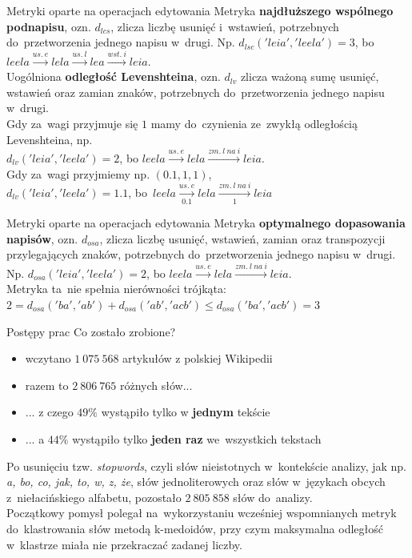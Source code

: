 \documentclass[11pt,pdftex,mathserif]{beamer}\usepackage[]{graphicx}\usepackage[]{color}
\theoremstyle{definition}
\begin{document}
\begin{frame}{Metryki oparte na operacjach edytowania}
Metryka \textbf{najdłuższego wspólnego podnapisu}, ozn. $d_{lcs}$, zlicza liczbę usunięć i~wstawień, potrzebnych do~przetworzenia jednego napisu w~drugi. Np. $d_{lsc}('leia', 'leela') = 3$, bo~$leela  \xrightarrow{us.\ e} lela  \xrightarrow{us.\ l} lea  \xrightarrow{wst.\ i} leia$.\\
\pause
Uogólniona \textbf{odległość Levenshteina}, ozn. $d_{lv}$ zlicza ważoną sumę usunięć, wstawień oraz zamian znaków, potrzebnych do~przetworzenia jednego napisu w~drugi. \\


\pause
Gdy za~wagi przyjmuje się $1$ mamy do~czynienia ze~zwykłą odległością Levenshteina, np. \\
$d_{lv}('leia', 'leela') = 2$, bo $leela  \xrightarrow{us.\ e} lela  \xrightarrow{zm.\ l\ na\ i} leia$. \\
\pause
Gdy za~wagi przyjmiemy np. $(0.1, 1, 1)$, \\
$d_{lv}('leia', 'leela') = 1.1$, bo~$leela  \xrightarrow[0.1]{us.\ e} lela  \xrightarrow[1]{zm.\ l\ na\ i} leia$ 
\end{frame}



\begin{frame}{Metryki oparte na operacjach edytowania}
Metryka \textbf{optymalnego dopasowania napisów}, ozn. $d_{osa}$, zlicza liczbę usunięć, wstawień, zamian oraz transpozycji przylegających znaków, potrzebnych do~przetworzenia jednego napisu w~drugi. Np. $d_{osa}('leia', 'leela') = 2$, bo $leela  \xrightarrow{us.\ e} lela  \xrightarrow{zm.\ l\ na\ i} leia$. \\
\pause
Metryka ta~nie spełnia nierówności trójkąta: $2 = d_{osa}('ba', 'ab') + d_{osa}('ab', 'acb') \leq d_{osa}('ba', 'acb') = 3$\\
\end{frame}

\begin{frame}{Postępy prac}
Co zostało zrobione?\\
\begin{itemize}
\item wczytano $1\ 075 \ 568$ artykułów z polskiej Wikipedii \pause
\item razem to $2\ 806\ 765$ różnych słów... \pause
\item ... z czego $49\%$ wystąpiło tylko w \textbf{jednym} tekście
\item ... a $44\%$ wystąpiło tylko \textbf{jeden raz} we~wszystkich tekstach
\end{itemize}
\pause
Po usunięciu tzw. \emph{stopwords}, czyli słów nieistotnych w~kontekście analizy, jak np. \emph{a, bo, co, jak, to, w, z, że}, słów jednoliterowych oraz słów w~językach obcych z~niełacińskiego alfabetu, pozostało $2\ 805\ 858$ słów do~analizy.\\
\pause
Początkowy pomysł polegał na~wykorzystaniu wcześniej wspomnianych metryk do~klastrowania słów metodą k-medoidów, przy czym maksymalna odległość w~klastrze miała nie przekraczać zadanej liczby.
\end{frame}
\end{document}
